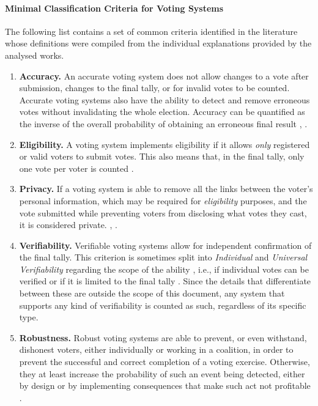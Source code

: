\documentclass[../access.tex]{subfiles}
\begin{document}
    \paragraph{Minimal Classification Criteria for Voting Systems}
    \label{minimum-classification-criteria}
    The following list contains a set of common criteria identified in the literature whose definitions were compiled from the individual explanations provided by the analysed works.
    \begin{enumerate}
        \item \textbf{Accuracy.} An accurate voting system does not allow changes to a vote after submission, changes to the final tally, or for invalid votes to be counted. Accurate voting systems also have the ability to detect and remove erroneous votes without invalidating the whole election. Accuracy can be quantified as the inverse of the overall probability of obtaining an erroneous final result \cite{Schneider2004}, \cite{Shamos1993}.
        
        \item \textbf{Eligibility.} A voting system implements eligibility if it allows \textit{only} registered or valid voters to submit votes. This also means that, in the final tally, only one vote per voter is counted \cite{Lee2000}.
        
        \item \textbf{Privacy.} If a voting system is able to remove all the links between the voter's personal information, which may be required for \textit{eligibility} purposes, and the vote submitted while preventing voters from disclosing what votes they cast, it is considered private. \cite{Hirt2000}, \cite{Benaloh1994}.
        
        \item \textbf{Verifiability.} Verifiable voting systems allow for independent confirmation of the final tally. This criterion is sometimes split into \textit{Individual} and \textit{Universal Verifiability} regarding the scope of the ability \cite{Rjaskova2002}, i.e., if individual votes can be verified or if it is limited to the final tally \cite{Sako1994}. Since the details that differentiate between these are outside the scope of this document, any system that supports any kind of verifiability is counted as such, regardless of its specific type.
        
        \item \textbf{Robustness.} Robust voting systems are able to prevent, or even withstand, dishonest voters, either individually or working in a coalition, in order to prevent the successful and correct completion of a voting exercise. Otherwise, they at least increase the probability of such an event being detected, either by design or by implementing consequences that make such act not profitable \cite{Schweisgut2006}.
    \end{enumerate}
\end{document}
